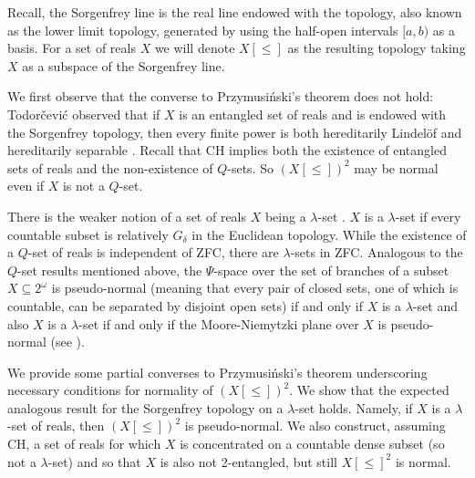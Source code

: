 \documentclass[11pt]{amsart}
\theoremstyle{definition}
\theoremstyle{remark}
\theoremstyle{plain}
\begin{document}
Recall, the Sorgenfrey line is the real line endowed with the topology, also known as the lower limit topology, generated by using the half-open intervals $[a,b)$ as a basis. For a set of reals $X$ we will denote $X[\leq]$ as the resulting topology taking $X$ as a subspace of the Sorgenfrey line.

We first observe that the converse to Przymusi\'nski's theorem does not hold: Todor\v cevi\'c observed that if $X$ is an entangled set \cite{Todorcevic1985} of reals and is endowed with the Sorgenfrey topology, then every finite power is both hereditarily Lindel\"of and hereditarily separable \cite{Todorcevic1989}.  Recall that CH implies both the existence of entangled sets of reals and the non-existence of $Q$-sets. So $(X[\leq])^{2}$ may be normal even if $X$ is not a $Q$-set. 


There is the weaker notion of a set of reals $X$ being a $\lambda$-set \cite{Miller1984}. $X$ is a $\lambda$-set if every countable subset is relatively $G_\delta$ in the Euclidean topology. While the existence of a $Q$-set of reals is independent of ZFC, there are $\lambda$-sets in ZFC. Analogous to the $Q$-set results mentioned above, the $\Psi$-space over the set of branches of a subset $X\subseteq 2^\omega$ is pseudo-normal (meaning that every pair of closed sets, one of which is countable, can be separated by disjoint open sets) if and only if $X$ is a $\lambda$-set and also $X$ is a $\lambda$-set if and only if the Moore-Niemytzki plane over $X$ is pseudo-normal (see \cite{vD}).

 We provide some partial converses to Przymusi\'nski's theorem underscoring necessary conditions for normality of $(X[\leq])^2$.
  We show that the expected analogous result for the Sorgenfrey topology on a $\lambda$-set holds. Namely, if $X$ is a $\lambda$-set of reals, then $(X[\leq])^2$ is pseudo-normal. We also construct, assuming CH, a set of reals for which $X$ is concentrated on a countable dense subset (so not a $\lambda$-set) and so that $X$ is also not 2-entangled, but still $X[\leq]^2$ is normal. 
 
\end{document}
